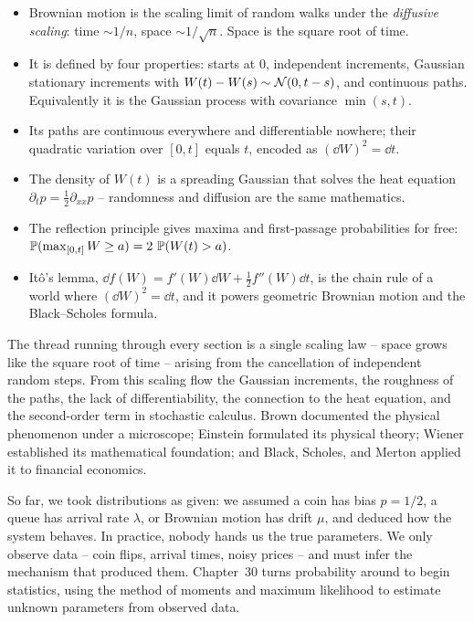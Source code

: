 \begin{focusbox}
\begin{itemize}
  \item Brownian motion is the scaling limit of random walks under the
  \emph{diffusive scaling}: time $\sim 1/n$, space $\sim 1/\sqrt n$. Space is the
  square root of time.
  \item It is defined by four properties: starts at $0$, independent increments,
  Gaussian stationary increments with $W(t)-W(s)\sim\Normal(0,t-s)$, and
  continuous paths. Equivalently it is the Gaussian process with covariance
  $\min(s,t)$.
  \item Its paths are continuous everywhere and differentiable nowhere; their
  quadratic variation over $[0,t]$ equals $t$, encoded as $(\dd W)^2 = \dd t$.
  \item The density of $W(t)$ is a spreading Gaussian that solves the heat
  equation $\partial_t p = \tfrac12\partial_{xx}p$ -- randomness and diffusion are
  the same mathematics.
  \item The reflection principle gives maxima and first-passage probabilities for
  free: $\P(\max_{[0,t]}W\ge a) = 2\,\P(W(t)>a)$.
  \item It\^o's lemma, $\dd f(W) = f'(W)\dd W + \tfrac12 f''(W)\dd t$, is the chain
  rule of a world where $(\dd W)^2=\dd t$, and it powers geometric Brownian motion
  and the Black--Scholes formula.
\end{itemize}
\end{focusbox}

The thread running through every section is a single scaling law -- space grows
like the square root of time -- arising from the cancellation of independent random
steps. From this scaling flow the Gaussian increments, the roughness of the paths,
the lack of differentiability, the connection to the heat equation, and the second-order term in stochastic
calculus. Brown documented the physical phenomenon under a microscope; Einstein formulated its physical theory;
Wiener established its mathematical foundation; and Black, Scholes, and Merton applied it to financial economics.

So far, we took distributions as given: we assumed a coin has bias $p=1/2$, a
queue has arrival rate $\lambda$, or Brownian motion has drift $\mu$, and deduced
how the system behaves. In practice, nobody hands us the true parameters. We
only observe data -- coin flips, arrival times, noisy prices -- and must infer the
mechanism that produced them. Chapter~30 turns probability around to begin
statistics, using the method of moments and maximum likelihood to estimate
unknown parameters from observed data.

